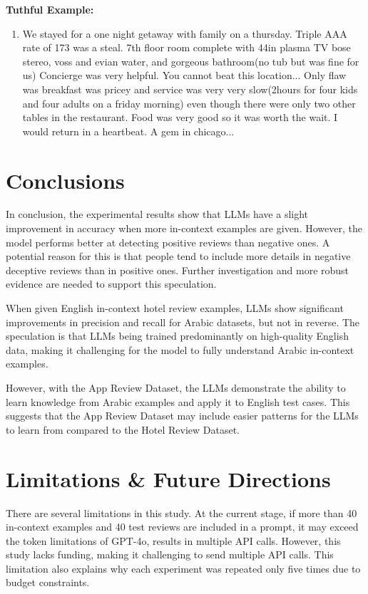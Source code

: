 \documentclass[sigconf, nonacm]{acmart}
\newenvironment{example}
{\begin{mdframed}[
    linecolor=exampleborder,
    linewidth=0.5pt,
    backgroundcolor=examplecolor,
    topline=false,
    bottomline=false,
    leftline=true,
    rightline=false,
    innertopmargin=2pt,
    innerbottommargin=2pt,
    innerleftmargin=5pt,
    innerrightmargin=5pt,
    skipabove=10pt,
    skipbelow=10pt
]}
{\end{mdframed}}
\theoremstyle{definition}
\begin{document}
\begin{example}
  \textbf{Tuthful Example:}
  \begin{enumerate}
    \item We stayed for a one night getaway with family on a thursday. Triple AAA rate of 173 was a steal. 7th floor room complete with 44in plasma TV bose stereo, voss and evian water, and gorgeous bathroom(no tub but was fine for us) Concierge was very helpful. You cannot beat this location... Only flaw was breakfast was pricey and service was very very slow(2hours for four kids and four adults on a friday morning) even though there were only two other tables in the restaurant. Food was very good so it was worth the wait. I would return in a heartbeat. A gem in chicago...
  \end{enumerate}
\end{example}

\section{Conclusions}

In conclusion, the experimental results show that LLMs have a slight improvement in accuracy when more in-context examples are given. However, the model performs better at detecting positive reviews than negative ones. A potential reason for this is that people tend to include more details in negative deceptive reviews than in positive ones. Further investigation and more robust evidence are needed to support this speculation.

When given English in-context hotel review examples, LLMs show significant improvements in precision and recall for Arabic datasets, but not in reverse. The speculation is that LLMs being trained predominantly on high-quality English data, making it challenging for the model to fully understand Arabic in-context examples.

However, with the App Review Dataset, the LLMs demonstrate the ability to learn knowledge from Arabic examples and apply it to English test cases. This suggests that the App Review Dataset may include easier patterns for the LLMs to learn from compared to the Hotel Review Dataset.

\section{Limitations \& Future Directions}
There are several limitations in this study. At the current stage, if more than 40 in-context examples and 40 test reviews are included in a prompt, it may exceed the token limitations of GPT-4o, results in multiple API calls. However, this study lacks funding, making it challenging to send multiple API calls. This limitation also explains why each experiment was repeated only five times due to budget constraints.
\end{document}
